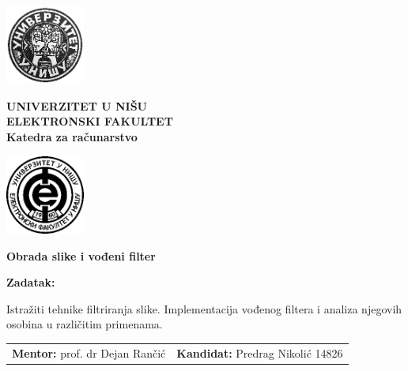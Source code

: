 \documentclass[a4paper,12pt,titlepage]{article}
\begin{document}
\begin{titlepage}
    \begin{center}
    
        \includegraphics[width=2.6cm]{img/uni.png}%
        \begin{minipage}[b]{0.7\textwidth}
            \centering
            \Large
            \textbf{UNIVERZITET U NIŠU\\ ELEKTRONSKI FAKULTET\\}       
            \large
            \textbf{Katedra za računarstvo}
        \end{minipage}%
        \includegraphics[width=2.6cm]{img/elfak.png}
        
              
      
        \vspace{5cm}
        \Large
        \textbf{Obrada slike i vođeni filter}
        
        \vspace{0.6cm}
        \normalsize
    \end{center}
    
    \vspace{1cm}
   
    \textbf{Zadatak:}
    
    \vspace{0.2cm}
    
    \setlength{\leftskip}{0.6cm}
    \noindent
    Istražiti tehnike filtriranja slike. Implementacija vođenog filtera i analiza njegovih osobina u različitim primenama.
    
    \vspace{1cm}
    
    \noindent \begin{tabu} to 
        \textbf{Mentor:} prof. dr Dejan Rančić &
        \textbf{Kandidat:} Predrag Nikolić 14826
    \end{tabu}
    

\end{titlepage}
\end{document}
